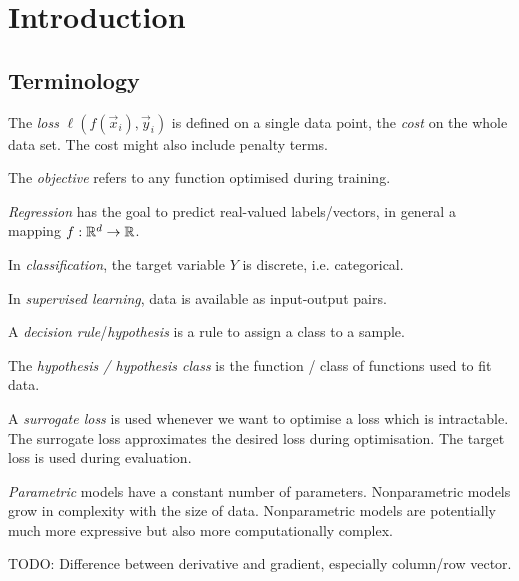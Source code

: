 \chapter{Introduction}


\section{Terminology}
The \emph{loss} $\ell(f(\vec{x}_i), \vec{y}_i)$ is defined
on a single data point,
the \emph{cost} on the whole data set.
The cost might also include penalty terms.

The \emph{objective} refers to any function
optimised during training.

\emph{Regression} has the goal to predict real-valued
labels/vectors, in general a mapping
$f : \mathbb{R}^d \to \mathbb{R}$.

In \emph{classification}, the target variable
$Y$ is discrete, i.e. categorical.

In \emph{supervised learning}, data is available
as input-output pairs.

A \emph{decision rule}/\emph{hypothesis} is a rule
to assign a class to a sample.

The \emph{hypothesis / hypothesis class} is the
function / class of functions used to fit data.

A \emph{surrogate loss} is used whenever we want
to optimise a loss which is intractable.
The surrogate loss approximates the desired
loss during optimisation.
The target loss is used during evaluation.

\emph{Parametric} models have a constant number of parameters.
Nonparametric models grow in complexity
with the size of data.
Nonparametric models are potentially much more expressive
but also more computationally complex.


TODO: Difference between derivative and gradient,
especially column/row vector.
